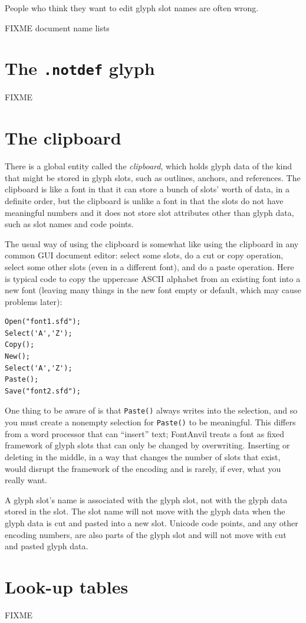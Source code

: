 \begin{framed}
People who think they want to edit glyph slot names are often wrong.
\end{framed}

FIXME document name lists

\section{The \texttt{.notdef} glyph}

FIXME

\section{The clipboard}

There is a global entity called the \emph{clipboard}, which holds glyph data
of the kind that might be stored in glyph slots, such as outlines, anchors,
and references.  The clipboard is like a font in that it can store a bunch
of slots' worth of data, in a definite order, but the clipboard is unlike a
font in that the slots do not have meaningful numbers and it does not store
slot attributes other than glyph data, such as slot names and code points. 

The usual way of using the clipboard is somewhat like using the clipboard in
any common GUI document editor: select some slots, do a cut or copy
operation, select some other slots (even in a different font), and do a
paste operation.  Here is typical code to copy the uppercase ASCII alphabet
from an existing font into a new font (leaving many things in the new font
empty or default, which may cause problems later):

\begin{verbatim}
Open("font1.sfd");
Select('A','Z');
Copy();
New();
Select('A','Z');
Paste();
Save("font2.sfd");
\end{verbatim}

One thing to be aware of is that \texttt{Paste()} always writes into the
selection, and so you must create a nonempty selection for \texttt{Paste()}
to be meaningful.  This differs from a word processor that can ``insert''
text; FontAnvil treats a font as fixed framework of glyph slots that can
only be changed by overwriting.  Inserting or deleting in the middle, in a
way that changes the number of slots that exist, would disrupt the framework
of the encoding and is rarely, if ever, what you really want.

\begin{framed}
A glyph slot's name is associated with the glyph slot, not with the glyph
data stored in the slot.  The slot name will not move with the glyph data
when the glyph data is cut and pasted into a new slot.  Unicode code points,
and any other encoding numbers, are also parts of the glyph slot and will
not move with cut and pasted glyph data.
\end{framed}

\section{Look-up tables}

FIXME

